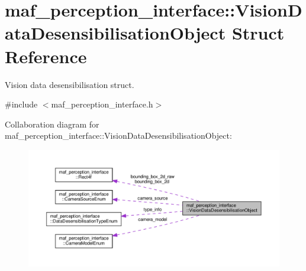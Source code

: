 \hypertarget{structmaf__perception__interface_1_1VisionDataDesensibilisationObject}{}\section{maf\+\_\+perception\+\_\+interface\+:\+:Vision\+Data\+Desensibilisation\+Object Struct Reference}
\label{structmaf__perception__interface_1_1VisionDataDesensibilisationObject}


Vision data desensibilisation struct.  




{\ttfamily \#include $<$maf\+\_\+perception\+\_\+interface.\+h$>$}



Collaboration diagram for maf\+\_\+perception\+\_\+interface\+:\+:Vision\+Data\+Desensibilisation\+Object\+:\nopagebreak
\begin{figure}[H]
\begin{center}
\leavevmode
\includegraphics[width=350pt]{structmaf__perception__interface_1_1VisionDataDesensibilisationObject__coll__graph}
\end{center}
\end{figure}
